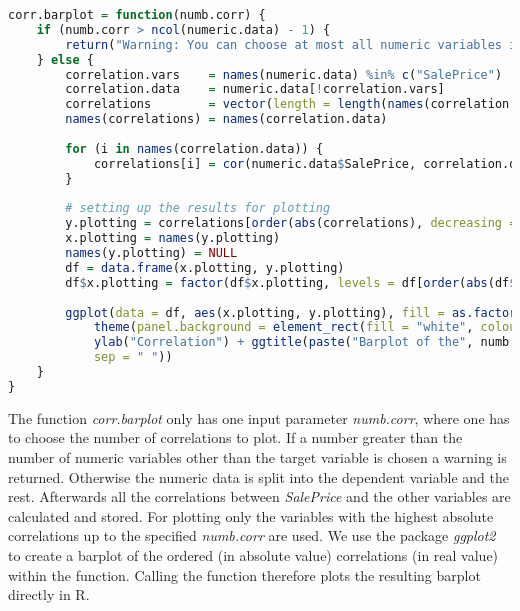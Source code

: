 \begin{lstlisting}[language=R]
corr.barplot = function(numb.corr) {
    if (numb.corr > ncol(numeric.data) - 1) {
        return("Warning: You can choose at most all numeric variables in the dataset except the target variable SalePrice, which is already implemented as default value")
    } else {
        correlation.vars    = names(numeric.data) %in% c("SalePrice")
        correlation.data    = numeric.data[!correlation.vars]                  # subsetting the numeric variables to not contain the target variable
        correlations        = vector(length = length(names(correlation.data))) # setting up vector for results (correlations)
        names(correlations) = names(correlation.data)
        
        for (i in names(correlation.data)) {                                   # calculating all bivariate correlations
            correlations[i] = cor(numeric.data$SalePrice, correlation.data[i], use = "pairwise.complete.obs")
        }
        
        # setting up the results for plotting
        y.plotting = correlations[order(abs(correlations), decreasing = TRUE)][1:numb.corr]
        x.plotting = names(y.plotting)
        names(y.plotting) = NULL
        df = data.frame(x.plotting, y.plotting)
        df$x.plotting = factor(df$x.plotting, levels = df[order(abs(df$y.plotting), decreasing = TRUE), "x.plotting"])
        
        ggplot(data = df, aes(x.plotting, y.plotting), fill = as.factor(x.plotting)) + geom_bar(stat = "identity", color = "black", fill = "black") + 
            theme(panel.background = element_rect(fill = "white", colour = "black"),axis.title.x = element_blank(), axis.text.x = element_text(angle = 90, vjust = 0.5, size = 12)) + 
            ylab("Correlation") + ggtitle(paste("Barplot of the", numb.corr, "highest bivariate correlations with SalePrice", 
            sep = " "))
    }
}
\end{lstlisting}
The function \textit{corr.barplot} only has one input parameter \textit{numb.corr}, where one has to choose the number of correlations to plot. If a number greater than the number of numeric variables other than the target variable is chosen a warning  is returned. Otherwise the numeric data is split into the dependent variable and the rest. Afterwards all the correlations between \textit{SalePrice} and the other variables are calculated and stored. For plotting only the variables with the highest absolute correlations up to the specified \textit{numb.corr} are used. We use the package \textit{ggplot2} to create a barplot of the ordered (in absolute value) correlations (in real value) within the function. Calling the function therefore plots the resulting barplot directly in \textsf{R}. \\
